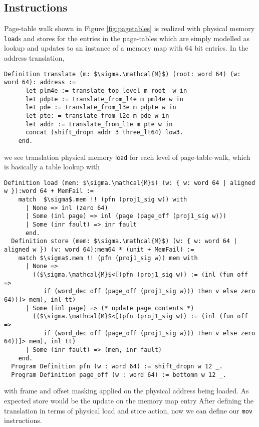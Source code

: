\subsection{Instructions}
\label{sec:instructions}
Page-table walk shown in Figure \ref{fig:pagetables} is realized with physical memory \texttt{load}s and \textsf{store}s for the entries in the page-tables which are simply modelled as lookup and updates to an instance of a memory map with 64 bit entries. In the address translation,
\begin{lstlisting}[language=Coq]
 Definition translate (m: $\sigma.\mathcal{M}$) (root: word 64) (w: word 64): address :=
      let plm4e := translate_top_level m root  w in
      let pdpte := translate_from_l4e m pml4e w in 
      let pde := translate_from_l3e m pdpte w in
      let pte: = translate_from_l2e m pde w in
      let addr := translate_from_l1e m pte w in
      concat (shift_dropn addr 3 three_lt64) low3.
    end.
\end{lstlisting}
we see translation physical memory $\mathsf{load}$ for each level of page-table-walk, which is basically a table lookup with
\begin{lstlisting}[language=Coq]
   Definition load (mem: $\sigma.\mathcal{M}$) (w: { w: word 64 | aligned w }):word 64 + MemFail :=
    match  $\sigma$.mem !! (pfn (proj1_sig w)) with
      | None => inl (zero 64)
      | Some (inl page) => inl (page (page_off (proj1_sig w)))
      | Some (inr fault) => inr fault
      end.
  Definition store (mem: $\sigma.\mathcal{M}$) (w: { w: word 64 | aligned w }) (v: word 64):mem64 * (unit + MemFail) :=
    match $\sigma$.mem !! (pfn (proj1_sig w)) mem with
      | None =>
        (($\sigma.\mathcal{M}$<[(pfn (proj1_sig w)) := (inl (fun off =>
           if (word_dec off (page_off (proj1_sig w))) then v else zero 64))]> mem), inl tt)
      | Some (inl page) => (* update page contents *)
        (($\sigma.\mathcal{M}$<[(pfn (proj1_sig w)) := (inl (fun off =>
           if (word_dec off (page_off (proj1_sig w))) then v else zero 64))]> mem), inl tt)
      | Some (inr fault) => (mem, inr fault)
    end.
  Program Definition pfn (w : word 64) := shift_dropn w 12 _.
  Program Definition page_off (w : word 64) := bottomn w 12 _.
\end{lstlisting}
with frame and offset masking applied on the physical address being loaded. As expected \textsf{store} would be the update on the memory map entry
After defining the translation in terms of physical load and store action, now we can define our \lstinline|mov| instructions.


